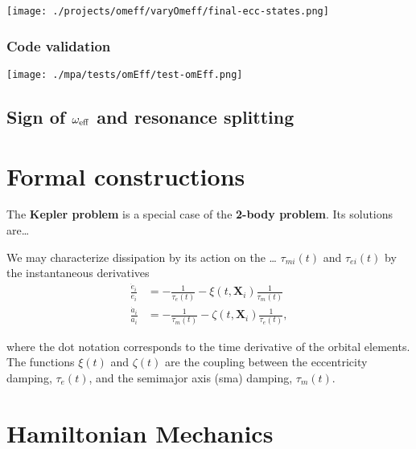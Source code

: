 \documentclass[11pt]{article}
\begin{document}
\begin{center}
\texttt{[image: ./projects/omeff/varyOmeff/final-ecc-states.png]}
\end{center}

\subsubsection{Code validation}
\label{sec:org3d7fd0d}
\begin{center}
\texttt{[image: ./mpa/tests/omEff/test-omEff.png]}
\end{center}


\subsection{Sign of \(\omega_{\rm eff}\) and resonance splitting}
\label{sec:org41a5ed5}

\section{Formal constructions}
\label{sec:org06c5a82}
The \textbf{Kepler problem} is a special case of the \textbf{2-body problem}.
Its solutions are\ldots{}

We may characterize dissipation by its action on the \ldots{}
\(\tau_{mi}(t)\) and \(\tau_{ei}(t)\) by the instantaneous derivatives
\begin{align}
   \frac{\dot e_i}{e_i} &= - \frac{1}{\tau_e(t)} - \xi(t, \mathbf X_i)\frac{1}{\tau_m(t)} \\
   \frac{\dot a_i}{a_i} &= -\frac{1}{\tau_m(t)} - \zeta(t, \mathbf X_i)\frac{1}{\tau_e(t)},
\end{align}
\noindent

\noindent
where the dot notation corresponds to the time derivative of the
orbital elements. The functions \(\xi(t)\) and \(\zeta(t)\) are the
coupling between the eccentricity damping, \(\tau_e(t)\), and the
semimajor axis (sma) damping, \(\tau_m(t)\).

\section{Hamiltonian Mechanics}
\label{sec:org761d552}
\end{document}

